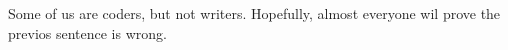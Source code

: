 
\label {fs-conclusion-tection}

Some  of us are coders, but not writers.  Hopefully, almost everyone wil prove  the previos sentence is wrong.





